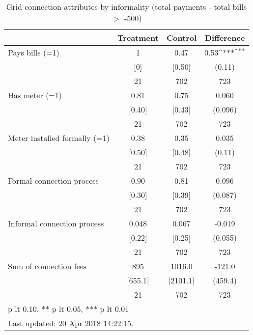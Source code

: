 \begin{table}[htbp]\centering
\def\sym#1{\ifmmode^{#1}\else\(^{#1}\)\fi}
\caption{Grid connection attributes by informality (total payments - total bills $>$ -500) \label{tab:"balance"}}
\begin{tabular*}{0.9\hsize}{@{\hskip\tabcolsep\extracolsep\fill}l*{1}{ccc}}
\toprule
                                &Treatment&  Control&Difference         \\
\midrule
Pays bills (=1)                 &        1&     0.47&     0.53\sym{***}\\
                                &      [0]&   [0.50]&   (0.11)         \\
                                &       21&      702&      723         \\
Has meter (=1)                  &     0.81&     0.75&    0.060         \\
                                &   [0.40]&   [0.43]&  (0.096)         \\
                                &       21&      702&      723         \\
Meter installed formally (=1)   &     0.38&     0.35&    0.035         \\
                                &   [0.50]&   [0.48]&   (0.11)         \\
                                &       21&      702&      723         \\
Formal connection process       &     0.90&     0.81&    0.096         \\
                                &   [0.30]&   [0.39]&  (0.087)         \\
                                &       21&      702&      723         \\
Informal connection process     &    0.048&    0.067&   -0.019         \\
                                &   [0.22]&   [0.25]&  (0.055)         \\
                                &       21&      702&      723         \\
Sum of connection fees          &      895&   1016.0&   -121.0         \\
                                &  [655.1]& [2101.1]&  (459.4)         \\
                                &       21&      702&      723         \\
\bottomrule
\multicolumn{4}{l}{\footnotesize * p lt 0.10, ** p lt 0.05, *** p lt 0.01}\\
\multicolumn{4}{l}{\footnotesize Last updated: 20 Apr 2018 14:22:15.}\\
\end{tabular*}
\end{table}
